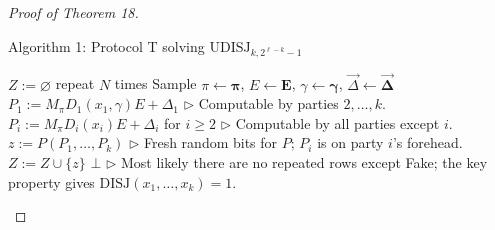 \begin{proof}[Proof of Theorem 18]
\begin{authorclaim}{Algorithm 1: Protocol T solving $\mathrm{UDISJ}_{k,2^{\ell-k}-1}$}
\begin{algorithmic}
\State $Z:=\varnothing$
\Loop\Statex repeat $N$ times
\State Sample $\pi\leftarrow\boldsymbol\pi$, $E\leftarrow\mathbf E$, $\gamma\leftarrow\boldsymbol\gamma$, $\vec\Delta\leftarrow\boldsymbol{\vec\Delta}$ 
\State $P_1:=M_\pi D_1(x_1,\gamma)E+\Delta_1$
\Statex $\triangleright$ Computable by parties $2,\ldots,k$.
\State $P_i:=M_\pi D_i(x_i)E+\Delta_i$ for $i\ge2$
\Statex $\triangleright$ Computable by all parties except $i$.
\State $z:=P(P_1,\ldots,P_k)$
\Statex $\triangleright$ Fresh random bits for $P$; $P_i$ is on party $i$'s forehead.
\State $Z:=Z\cup\{z\}$
\EndLoop
{}\State \Return $\bot$
\State {}
\Statex $\triangleright$ Most likely there are no repeated rows except Fake; the key property gives $\mathrm{DISJ}(x_1,\ldots,x_k)=1$.
\EndIf
\State {}
\end{algorithmic}
\end{authorclaim}

\end{proof}
